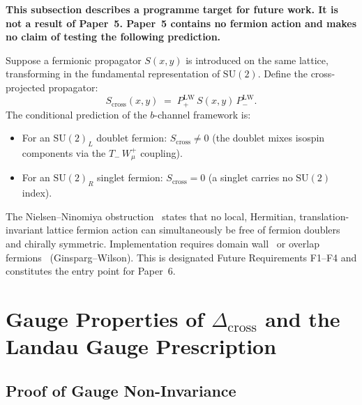 \documentclass[12pt]{article}
\numberwithin{equation}{section}
\theoremstyle{plain}
\theoremstyle{definition}
\theoremstyle{remark}
\newcommand{\su}{\mathrm{SU}}              %
\newcommand{\Dcross}{\Delta_{\mathrm{cross}}}  %
\newcommand{\PLW}{P^{\mathrm{LW}}}         %
\begin{document}
	\noindent
	\textbf{This subsection describes a programme target for future work.
		It is not a result of Paper~5.  Paper~5 contains no fermion action
		and makes no claim of testing the following prediction.}
	
	\medskip
	Suppose a fermionic propagator $S(x,y)$ is introduced on the same
	lattice, transforming in the fundamental representation of $\su(2)$.
	Define the cross-projected propagator:
	\begin{equation}
		S_{\mathrm{cross}}(x,y) \;=\; \PLW_+ \, S(x,y) \, \PLW_-.
		\label{eq:Scross-def}
	\end{equation}
	The conditional prediction of the $b$-channel framework is:
	
	\begin{itemize}
		\item For an $\su(2)_L$ doublet fermion: $S_{\mathrm{cross}}
		\neq 0$ (the doublet mixes isospin components via the
		$T_{-}\,W^{+}_{\mu}$ coupling).
		
		\item For an $\su(2)_R$ singlet fermion: $S_{\mathrm{cross}} = 0$
		(a singlet carries no $\su(2)$ index).
	\end{itemize}
	
	The Nielsen--Ninomiya obstruction~\cite{NielsenNinomiya1981a,%
		NielsenNinomiya1981b} states that no local, Hermitian,
	translation-invariant lattice fermion action can simultaneously be
	free of fermion doublers and chirally symmetric.  Implementation
	requires domain wall~\cite{Kaplan1992} or overlap
	fermions~\cite{Neuberger1998} (Ginsparg--Wilson).
	This is designated Future Requirements F1--F4 and constitutes the
	entry point for Paper~6.
	
	\section{Gauge Properties of \texorpdfstring{$\Dcross$}{Delta\_cross}
		and the Landau Gauge Prescription}
	\label{sec:gauge-properties}
	
	
	\subsection{Proof of Gauge Non-Invariance}
	\label{sec:gauge-noninv}
	
\end{document}
